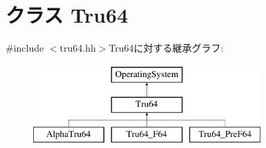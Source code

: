 \hypertarget{classTru64}{
\section{クラス Tru64}
\label{classTru64}
}


{\ttfamily \#include $<$tru64.hh$>$}Tru64に対する継承グラフ:\begin{figure}[H]
\begin{center}
\leavevmode
\includegraphics[height=3cm]{classTru64}
\end{center}
\end{figure}

